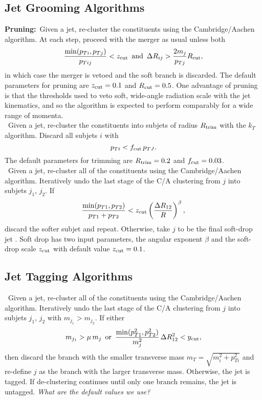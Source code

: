 \subsection{Jet Grooming Algorithms}
 
 {\bf Pruning:}~Given a jet, re-cluster the constituents using the Cambridge/Aachen algorithm. At each step, proceed with the merger as usual unless both
 \begin{equation}
 \frac{\mathrm{min}(p_{Ti},p_{Tj})}{p_{Tij}} < z_{\rm cut}\,\,\,\mathrm{and}\,\,\,\Delta R_{ij} > \frac{2m_j}{p_{Tj}} R_{\rm cut},
 \end{equation}
 in which case the merger is vetoed and the soft branch is discarded. The default parameters for pruning are $z_{\rm cut}=0.1$ and $R_{\rm cut}=0.5$. One advantage of pruning is that the thresholds used
 to veto soft, wide-angle radiation scale with the jet kinematics, and so the algorithm is expected to perform comparably for a wide range of momenta.\\

 ~Given a jet, re-cluster the constituents into subjets of radius $R_{\rm trim}$ with the $k_T$ algorithm. Discard all subjets $i$ with 
 \begin{equation}
 p_{Ti} < f_{\rm cut} \, p_{TJ}.
 \end{equation}
 The default parameters for trimming are $R_{\rm trim}=0.2$ and $f_{\rm cut}=0.03$.\\
 
 ~Given a jet, re-cluster all of the constituents using the Cambridge/Aachen algorithm. Iteratively undo the last stage of the C/A clustering from $j$ into subjets $j_1$, $j_2$. If
 \begin{equation}
 \frac{\mathrm{min}(p_{T1},p_{T2})}{p_{T1}+p_{T2}} < z_{\rm cut} \left(\frac{\Delta R_{12}}{R}\right)^\beta,
 \end{equation}
 discard the softer subjet and repeat. Otherwise, take $j$ to be the final soft-drop jet \cite{}. Soft drop has two input parameters, the angular exponent $\beta$ and the soft-drop scale $z_{\rm cut}$ with default value $z_{\rm cut}=0.1$.
 
 
\subsection{Jet Tagging Algorithms}

~Given a jet, re-cluster all of the constituents using the Cambridge/Aachen algorithm. Iteratively undo the last stage of the C/A clustering from $j$ into subjets $j_1$, $j_2$ with $m_{j_1}>m_{j_2}$. If either
%
\begin{equation}
m_{j_1} > \mu \, m_j\,\,\,\mathrm{or}\,\,\, \frac{\mathrm{min}(p_{T1}^2,p_{T2}^2)}{m_j^2}\,\Delta R_{12}^2 < y_{\rm cut},
\end{equation}
%
then discard the branch with the smaller transverse mass $m_T = \sqrt{m_i^2 + p_{Ti}^2}$ and re-define $j$ as the branch with the larger transverse mass. Otherwise, the jet is tagged. If de-clustering continues until only one branch remains, the jet is untagged. \emph{What are the default values we use?}\\


